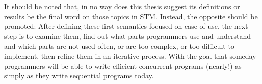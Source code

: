 It should be noted that, in no way does this thesis suggest its definitions or results be the final
word on those topics in STM.
Instead, the opposite should be promoted:
After defining these first semantics focused on ease of use, the next step is to examine them,
find out what parts programmers use and understand and which parts are not used often, or
are too complex, or too difficult to implement, then refine them in an iterative process.
With the goal that someday programmers will be able to write efficient concurrent programs
(nearly!) as simply as they write sequential programs today.
